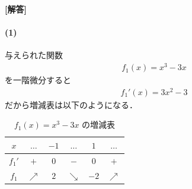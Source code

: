 \documentclass[../../main.tex]{subfiles}
\begin{document}
\begin{oframed}
  
\end{oframed}

{\bf [解答]}

\paragraph{(1)}

与えられた関数
\begin{align}
  f_1(x) = x^3-3x
\end{align}
を一階微分すると
\begin{align}
  f_1'(x) = 3x^2 - 3
\end{align}
だから増減表は以下のようになる．

\begin{table}[htb]
  \centering
  \caption{$f_1(x)=x^3-3x$ の増減表}
  \begin{tabular}{|c|ccccc|}
    \hline
    $x$ & $\dots$ & $-1$ & $\dots$ & $1$ & $\dots$ \\ \hline
    $f_1'$ & $+$ & $0$ & $-$ & $0$ & $+$ \\ \hline
    $f_1$ & $\nearrow$ & $2$ & $\searrow$ & $-2$ & $\nearrow$ \\ \hline
  \end{tabular}
\end{table}
\end{document}
